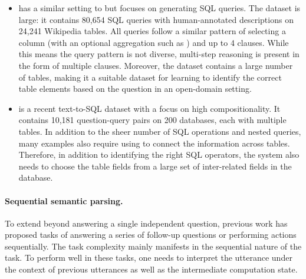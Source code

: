 \begin{itemize}
\item {} \cite{zhong2017seq2sql}
has a similar setting to \wtq but focuses on generating SQL queries.
The dataset is large: it contains 80,654 SQL queries with
human-annotated descriptions on 24,241 Wikipedia tables.
All queries follow a similar pattern of selecting a column
(with an optional aggregation such as )
and up to 4  clauses.
While this means the query pattern is not diverse,
multi-step reasoning is present in the form of multiple  clauses.
Moreover, the dataset contains a large number of tables,
making it a suitable dataset
for learning to identify the correct table elements
based on the question in an open-domain setting.

\item {} \cite{yu2018spider}
is a recent text-to-SQL dataset with a focus on high compositionality.
It contains 10,181 question-query pairs
on 200 databases, each with multiple tables.
In addition to the sheer number of SQL operations
and nested queries,
many examples also require using  to connect the information
across tables.
Therefore, in addition to identifying the right SQL operators,
the system also needs to choose the table fields from a large set
of inter-related fields in the database.

\end{itemize}

\paragraph{Sequential semantic parsing.}
To extend beyond answering a single independent question,
previous work has proposed tasks of answering a series of
follow-up questions or performing actions sequentially.
The task complexity mainly manifests in the sequential nature
of the task.
To perform well in these tasks,
one needs to interpret the utterance under
the context of previous utterances
as well as the intermediate computation state.

